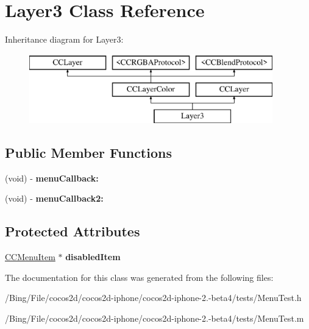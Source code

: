 \hypertarget{interface_layer3}{\section{Layer3 Class Reference}
\label{interface_layer3}
}
Inheritance diagram for Layer3\-:\begin{figure}[H]
\begin{center}
\leavevmode
\includegraphics[height=3.000000cm]{interface_layer3}
\end{center}
\end{figure}
\subsection*{Public Member Functions}
\begin{DoxyCompactItemize}
\item 
\hypertarget{interface_layer3_ae74e3a6345b47ddbca20e7e83228efa5}{(void) -\/ {\bfseries menu\-Callback\-:}}\label{interface_layer3_ae74e3a6345b47ddbca20e7e83228efa5}

\item 
\hypertarget{interface_layer3_a906cfe3ffbbc78f21b89fcf8b10e850a}{(void) -\/ {\bfseries menu\-Callback2\-:}}\label{interface_layer3_a906cfe3ffbbc78f21b89fcf8b10e850a}

\end{DoxyCompactItemize}
\subsection*{Protected Attributes}
\begin{DoxyCompactItemize}
\item 
\hypertarget{interface_layer3_a7b1e72f94d5e84592cdc4bf4e983dd05}{\hyperlink{interface_c_c_menu_item}{C\-C\-Menu\-Item} $\ast$ {\bfseries disabled\-Item}}\label{interface_layer3_a7b1e72f94d5e84592cdc4bf4e983dd05}

\end{DoxyCompactItemize}


The documentation for this class was generated from the following files\-:\begin{DoxyCompactItemize}
\item 
/\-Bing/\-File/cocos2d/cocos2d-\/iphone/cocos2d-\/iphone-\/2.-\/beta4/tests/Menu\-Test.\-h\item 
/\-Bing/\-File/cocos2d/cocos2d-\/iphone/cocos2d-\/iphone-\/2.-\/beta4/tests/Menu\-Test.\-m\end{DoxyCompactItemize}
